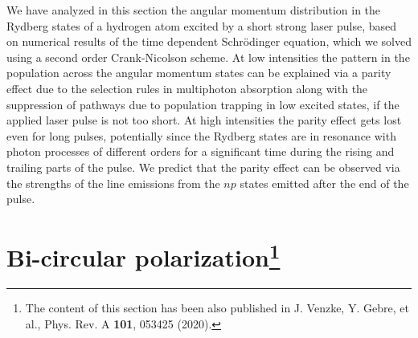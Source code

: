 We have analyzed in this section the angular momentum distribution in the Rydberg states of a hydrogen atom excited by a short strong laser pulse, based on numerical results of the time dependent Schr\"odinger equation, which we solved using a second order Crank-Nicolson scheme. At low intensities the pattern in the population across the angular momentum states can be explained via a parity effect due to the selection rules in multiphoton absorption along with the suppression of pathways due to population trapping in low excited states, if the applied laser pulse is not too short. At high intensities the parity effect gets lost even for long pulses, potentially since the Rydberg states are in resonance with photon processes of different orders for a significant time during the rising and trailing parts of the pulse. We predict that the parity effect can be observed via the strengths of the line emissions from the $np$ states emitted after the end of the pulse. 

\section[Bi-circular polarization]{Bi-circular polarization\protect\footnote{The content of this section has been also published in J. Venzke, Y. Gebre, et al., Phys. Rev. A \textbf{101}, 053425  (2020).}} %
\label{sec:bi_circular_polarization}

